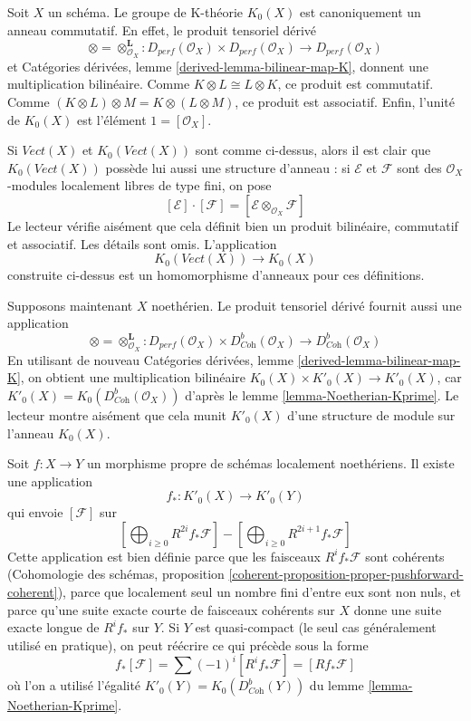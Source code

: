 \begin{remark}
\label{remark-K-ring}
Soit $X$ un schéma. Le groupe de K-théorie $K_0(X)$ est canoniquement un anneau commutatif.
En effet, le produit tensoriel dérivé
$$
\otimes = \otimes^\mathbf{L}_{\mathcal{O}_X} :
D_{perf}(\mathcal{O}_X) \times D_{perf}(\mathcal{O}_X)
\longrightarrow
D_{perf}(\mathcal{O}_X)
$$
et Catégories dérivées, lemme \ref{derived-lemma-bilinear-map-K},
donnent une multiplication bilinéaire. Comme $K \otimes L \cong L \otimes K$,
ce produit est commutatif. Comme
$(K \otimes L) \otimes M = K \otimes (L \otimes M)$,
ce produit est associatif.
Enfin, l'unité de $K_0(X)$ est l'élément $1 = [\mathcal{O}_X]$.

\medskip\noindent
Si $\textit{Vect}(X)$ et $K_0(\textit{Vect}(X))$ sont comme ci-dessus, alors
il est clair que $K_0(\textit{Vect}(X))$ possède lui aussi une
structure d'anneau : si $\mathcal{E}$ et $\mathcal{F}$ sont des
$\mathcal{O}_X$-modules localement libres de type fini, on pose
$$
[\mathcal{E}] \cdot [\mathcal{F}] =
[\mathcal{E} \otimes_{\mathcal{O}_X} \mathcal{F}]
$$
Le lecteur vérifie aisément que cela définit bien un produit bilinéaire,
commutatif et associatif. Les détails sont omis. L'application
$$
K_0(\textit{Vect}(X)) \longrightarrow K_0(X)
$$
construite ci-dessus est un homomorphisme d'anneaux pour ces définitions.

\medskip\noindent
Supposons maintenant $X$ noethérien. Le produit tensoriel dérivé fournit aussi
une application
$$
\otimes = \otimes^\mathbf{L}_{\mathcal{O}_X} :
D_{perf}(\mathcal{O}_X) \times D^b_{\textit{Coh}}(\mathcal{O}_X)
\longrightarrow
D^b_{\textit{Coh}}(\mathcal{O}_X)
$$
En utilisant de nouveau Catégories dérivées, lemme \ref{derived-lemma-bilinear-map-K},
on obtient une multiplication bilinéaire $K_0(X) \times K'_0(X) \to K'_0(X)$,
car $K'_0(X) = K_0(D^b_{\textit{Coh}}(\mathcal{O}_X))$ d'après le
lemme \ref{lemma-Noetherian-Kprime}.
Le lecteur montre aisément que cela munit $K'_0(X)$ d'une structure
de module sur l'anneau $K_0(X)$.
\end{remark}

\begin{remark}
\label{remark-pushforward-K}
Soit $f : X \to Y$ un morphisme propre de schémas localement noethériens.
Il existe une application
$$
f_* : K'_0(X) \longrightarrow K'_0(Y)
$$
qui envoie $[\mathcal{F}]$ sur
$$
[\bigoplus\nolimits_{i \geq 0} R^{2i}f_*\mathcal{F}] -
[\bigoplus\nolimits_{i \geq 0} R^{2i + 1}f_*\mathcal{F}]
$$
Cette application est bien définie parce que les faisceaux $R^if_*\mathcal{F}$
sont cohérents (Cohomologie des schémas, proposition
\ref{coherent-proposition-proper-pushforward-coherent}), parce que localement
seul un nombre fini d'entre eux sont non nuls, et parce qu'une
suite exacte courte de faisceaux cohérents sur $X$ donne une suite exacte
longue de $R^if_*$ sur $Y$. Si $Y$ est quasi-compact (le seul
cas généralement utilisé en pratique), on peut réécrire ce qui précède sous la forme
$$
f_*[\mathcal{F}] = \sum (-1)^i[R^if_*\mathcal{F}] = [Rf_*\mathcal{F}]
$$
où l'on a utilisé l'égalité $K'_0(Y) = K_0(D^b_{\textit{Coh}}(Y))$ du
lemme \ref{lemma-Noetherian-Kprime}.
\end{remark}

